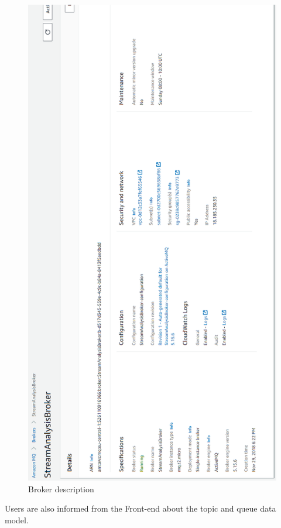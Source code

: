 \begin{figure}[p]
	\centering
	\noindent
	\includegraphics[width=0.5\paperwidth]{./images/aws_resources/AmazonMQ.PNG}
	\caption{Broker description}
	\label{fig:amazonMQ}
\end{figure}


Users are also informed from the Front-end about the topic and queue data model. \\


